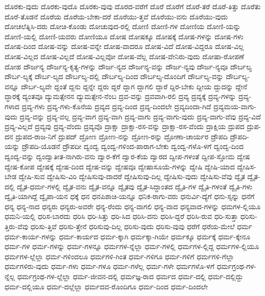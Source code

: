 {ದೊರಕು-ವುದು
ದೊರಕು-ವುದೊ
ದೊರಕು-ವುವು
ದೊರದ-ವರೆಗೆ
ದೊರೆ
ದೊರೆಗೆ
ದೊರೆ-ತರೆ
ದೊರೆ-ತಿತ್ತು
ದೊರೆತು
ದೊರೆ-ತೊಡನೆ
ದೊರೆಯ
ದೊರೆಯ-ಬೇಕಾ-ದರೆ
ದೊರೆಯು-ತ್ತವೆ
ದೊರೆಯು-ವನು
ದೊರೆಯು-ವುದು
ದೋಚಲೆತ್ನಿಸಿ-ದರು
ದೋಚಿ-ಕೊಂಡು
ದೋಚುವುದ-ರಲ್ಲಿ
ದೋಣಿ
ದೋಣಿ-ಗಳ
ದೋಣಿಯ
ದೋಣಿ-ಯನ್ನು
ದೋಣಿ-ಯಲ್ಲಿ
ದೋಣಿ-ಯವರು
ದೋಣಿಯೂ
ದೋಷ
ದೋಷಕ್ಕೂ
ದೋಷಕ್ಕೆ
ದೋಷ-ಗಳನ್ನು
ದೋಷ-ಗಳು
ದೋಷ-ದಿಂದ
ದೋಷ-ವನ್ನು
ದೋಷ-ವನ್ನೇ
ದೋಷ-ವಾದರೂ
ದೋಷ-ವಿದೆ
ದೋಷ-ವಿದ್ದರೂ
ದೋಷ-ವಿಲ್ಲ
ದೋಷ-ವಿಲ್ಲದ
ದೋಷ-ವಿಲ್ಲದೆ
ದೋಷ-ವಿಲ್ಲವೋ
ದೋಷ-ವೆಲ್ಲ
ದೋಷ-ವೇನಿರು-ವುದು
ದೋಷಾ-ರೋಪಣೆ
ದೋಹ
ದೌರ್ಜನ್ಯ
ದೌರ್ಜನ್ಯ-ಕೃತ್ಯ-ಗಳನ್ನು
ದೌರ್ಜ-ನ್ಯದ
ದೌರ್ಜನ್ಯ-ವನ್ನು
ದೌರ್ಜ-ನ್ಯವು
ದೌರ್ಜ-ನ್ಯವೂ
ದೌರ್ಬಲ್ಯ
ದೌರ್ಬ-ಲ್ಯಕ್ಕೆ
ದೌರ್ಬ-ಲ್ಯದ
ದೌರ್ಬಲ್ಯ-ದಲ್ಲಿ
ದೌರ್ಬಲ್ಯ-ದಿಂದ
ದೌರ್ಬಲ್ಯ-ದೊಂದಿಗೆ
ದೌರ್ಬಲ್ಯ-ವನ್ನು
ದೌರ್ಬಲ್ಯ-ವನ್ನೂ
ದೌರ್ಬ-ಲ್ಯವೇ
ದ್ದಂತೆ
ದ್ದನು
ದ್ದನ್ನೇ
ದ್ದರು
ದ್ದರೆ
ದ್ದಾಗ
ದ್ದಾಗಲಿ
ದ್ದಾರೆ
ದ್ದಿರ-ಬೇಕು
ದ್ದೀಯ
ದ್ದುದನ್ನು
ದ್ದೇನೆ
ದ್ಧಾರಕ್ಕೆ
ದ್ಯಂತವೂ
ದ್ಯುಮತ್ಸೇನನ
ದ್ಯುಮತ್ಸೇನ-ನೆಂಬ
ದ್ರವ-ವನ್ನು
ದ್ರವವಾಗಿ-ರಲಿ
ದ್ರವ್ಯ
ದ್ರವ್ಯಕ್ಕೆ
ದ್ರವ್ಯ-ಗಳನ್ನು
ದ್ರವ್ಯ-ಗಳಾದ
ದ್ರವ್ಯ-ಗಳು
ದ್ರವ್ಯ-ಗಳು-ಕೊನೆಯ
ದ್ರವ್ಯದ
ದ್ರವ್ಯ-ದಿಂದ
ದ್ರವ್ಯ-ದಿಂದಲೇ
ದ್ರವ್ಯದಿಂದಾ-ಗಿದೆ
ದ್ರವ್ಯಮಯ-ವಾಗು-ವುದು
ದ್ರವ್ಯ-ವನ್ನು
ದ್ರವ್ಯ-ವಲ್ಲ
ದ್ರವ್ಯ-ವಾಗ
ದ್ರವ್ಯ-ವಾಗಿ
ದ್ರವ್ಯ-ವಾಗು
ದ್ರವ್ಯ-ವಾಗು-ವುದು
ದ್ರವ್ಯ-ವಾಗು-ವೆವು
ದ್ರವ್ಯ-ವಿದೆ
ದ್ರವ್ಯ-ವಿಲ್ಲದೆ
ದ್ರವ್ಯವು
ದ್ರವ್ಯ-ವೆಂದು
ದ್ರವ್ಯವೊ
ದ್ರಾಕ್ಷಾ
ದ್ರಾಕ್ಷಾ-ರಸ-ವನ್ನು
ದ್ರಾಕ್ಷಾ-ರಸ-ವೆಂದು
ದ್ರಾಕ್ಷಿಯ
ದ್ರುಪದ
ದ್ರುಪ-ದನ
ದ್ರುಪದ-ರಾಜ-ನಿಗೆ
ದ್ರುಪದ್
ದ್ರೋಣ
ದ್ರೋಣ-ನನ್ನು
ದ್ರೋಣ-ರನ್ನು
ದ್ರೋಣಾ-ಚಾರ್ಯರ
ದ್ರೌಪದಿ
ದ್ರೌಪದಿ-ಯನ್ನು
ದ್ರೌಪದಿ-ಯೊಡನೆ
ದ್ರೌಪದೀ
ದ್ವಂದ್ವ
ದ್ವಂದ್ವ-ಗಳಿಂದ-ಪಾರಾಗ-ಬೇಕು
ದ್ವಂದ್ವ-ಗಳೊ-ಳಗೆ
ದ್ವಂದ್ವ-ದಿಂದ
ದ್ವಂದ್ವ-ವನ್ನು
ದ್ವಂದ್ವಾತೀತ-ನಾಗಿರು-ವನು
ದ್ವಾರ-ಕೆಗೆ
ದ್ವಾರ-ಕೆಯ
ದ್ವಾರದ
ದ್ವೀಪ-ಗಳಂತೆ
ದ್ವೀಪ-ಸ್ತೋಮ
ದ್ವೇಷ
ದ್ವೇಷ-ಕೋಪ
ದ್ವೇಷಕ್ಕೆ
ದ್ವೇಷ-ದಿಂದ
ದ್ವೇಷ-ವನ್ನು
ದ್ವೇಷವೂ
ದ್ವೇಷಾಸೂಯೆ-ಗಳನ್ನು
ದ್ವೇಷಿ
ದ್ವೇಷಿ-ಯಾದ
ದ್ವೇಷಿಸ-ಬೇಡ
ದ್ವೇಷಿ-ಸುವ
ದ್ವೇಷಿಸು-ವಿರಿ
ದ್ವೇಷಿಸುವು-ದಾದರೆ
ದ್ವೇಷಿಸುವು-ದಿಲ್ಲ
ದ್ವೇಷಿಸು-ವುದು
ದ್ವೇಷಿಸು-ವೆವು
ದ್ವೈತ
ದ್ವೈತ-ದಲ್ಲಿ
ದ್ವೈತ-ಧರ್ಮ-ಗಳಲ್ಲಿ
ದ್ವೈತ-ವನು
ದ್ವೈತ-ವನ್ನೂ
ದ್ವೈತವು
ದ್ವೈತ-ಸಿದ್ಧಾಂತದ
ದ್ವೈತಿ-ಗಳ
ದ್ವೈತಿ-ಗಳಂತೆ
ದ್ವೈತಿ-ಗಳು
ದ್ವೈತಿ-ಯಾಗಿದ್ದೆ
ದ್ವೈಪಾ-ಯನ
ಧಕ್ಕೆ
ಧನ
ಧನಪಿಶಾಚಿ-ಯನ್ನೂ
ಧನಿಕ-ರಾಗು-ವರು
ಧನುರ್ವಿ-ದ್ಯೆಗೆ
ಧನು-ಸ್ಸನ್ನು
ಧನೆಗೆ
ಧನ್ಯ
ಧನ್ಯ-ನಾದ
ಧನ್ಯರು
ಧನ್ಯರು-ಅವರೇ
ಧನ್ಯ-ರೆಂದು
ಧನ್ಯ-ವಾಗಲಿ
ಧನ್ಯ-ವಾದ
ಧನ್ಯವಾದ-ಗಳನ್ನು
ಧಮಗಳ-ಲ್ಲಿಯೂ
ಧಮನಿ-ಯಲ್ಲಿ
ಧರಿಸ-ಬಾರದು
ಧರಿಸಿ
ಧರಿ-ಸಿತ್ತು
ಧರಿ-ಸಿದ
ಧರಿಸಿ-ದನು
ಧರಿಸಿ-ದ್ದರೆ
ಧರಿಸಿ-ರುವ
ಧರಿ-ಸುತ್ತಾ
ಧರಿಸು-ತ್ತಿರು-ವೆವು
ಧರಿಸು-ತ್ತಿವೆ
ಧರಿಸು-ತ್ತೇನೆ
ಧರಿಸುವು-ದಿಲ್ಲ
ಧರಿಸು-ವುದು
ಧರಿಸು-ವುವು
ಧರೆಗೆ
ಧರೆಯ-ಮೇಲೆ
ಧರ್ಮ
ಧರ್ಮ-ಕಾರ್ಯ-ಗಳನ್ನು
ಧರ್ಮ-ಕಾರ್ಯದ
ಧರ್ಮ-ಕ್ಕಾಗಿ
ಧರ್ಮಕ್ಕಾ-ಗಿಯೇ
ಧರ್ಮಕ್ಕೂ
ಧರ್ಮಕ್ಕೆ
ಧರ್ಮ-ಕ್ಕೇನೂ
ಧರ್ಮ-ಗಳ
ಧರ್ಮ-ಗಳನ್ನು
ಧರ್ಮ-ಗಳನ್ನೂ
ಧರ್ಮಗಳ-ನ್ನೆಲ್ಲಾ
ಧರ್ಮ-ಗಳಲ್ಲಿ
ಧರ್ಮಗಳ-ಲ್ಲಿದ್ದ
ಧರ್ಮಗಳ-ಲ್ಲಿಯೂ
ಧರ್ಮಗಳ-ಲ್ಲೆಲ್ಲಾ
ಧರ್ಮ-ಗಳಿಂದಲೂ
ಧರ್ಮಗಳಿ-ಗಿಂತ
ಧರ್ಮ-ಗಳಿಗೂ
ಧರ್ಮ-ಗಳಿಗೆ
ಧರ್ಮಗಳಿ-ಗೆಲ್ಲಾ
ಧರ್ಮಗಳಿರು-ವುದು
ಧರ್ಮ-ಗಳು
ಧರ್ಮ-ಗಳೂ
ಧರ್ಮ-ಗಳೆಲ್ಲ
ಧರ್ಮ-ಗಳೇ
ಧರ್ಮಗಳೊ-ಳಗೆ
ಧರ್ಮಗ್ರಂಥ-ಗಳ-ನ್ನೆಲ್ಲ
ಧರ್ಮಗ್ರಂಥ-ಗಳ-ಲ್ಲೆಲ್ಲಾ
ಧರ್ಮ-ಜೀವನ-ದಲ್ಲಿ
ಧರ್ಮಜ್ಞ-ರಾದ
ಧರ್ಮದ
ಧರ್ಮ-ದಲ್ಲಿ
ಧರ್ಮ-ದಲ್ಲಿದ್ದು
ಧರ್ಮ-ದಲ್ಲಿಯೂ
ಧರ್ಮ-ದಲ್ಲೆಲ್ಲಾ
ಧರ್ಮದವ-ರೊಂದಿಗೂ
ಧರ್ಮ-ದಿಂದ
ಧರ್ಮ-ದಿಂದಲೇ
}
